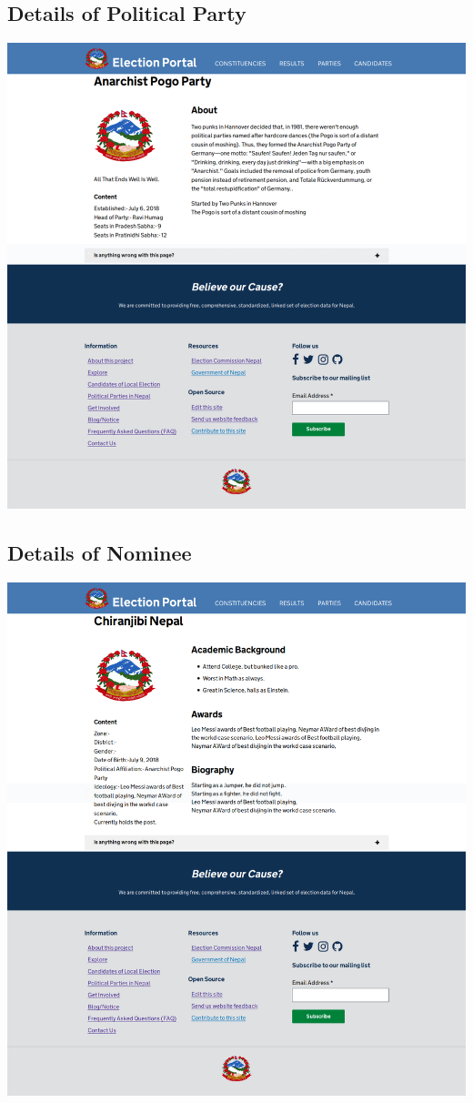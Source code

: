 \documentclass[12pt, a4paper, titlepage]{report}
\begin{document}
\subsection{Details of Political Party}
\begin{center}
\includegraphics[scale=0.25]{Details_of_Political_Party.png}
\end{center}

\subsection{Details of Nominee}
\begin{center}
\includegraphics[scale=0.25]{Details_of_a_nominee.png}
\end{center}
\end{document}
